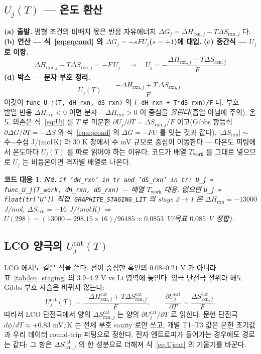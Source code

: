 \documentclass[11pt,a4paper]{article}
\newtheorem*{codebox}{코드 대응}
\newcommand{\rxn}{\mathrm{rxn}}
\newcommand{\work}{\mathrm{work}}
\newcommand{\code}[1]{\texttt{#1}}
\begin{document}
\subsection{$U_j(T)$ — 온도 환산}
\textbf{(a) 출발.} 평형 조건의 비배치 몫은 반응 자유에너지 $\Delta G_j=\Delta H_{\rxn,j}-T\Delta S_{\rxn,j}$ 다.
\textbf{(b) 연산 — 식~\eqref{eq:eqcond} 의 $\Delta G_j=-sFU_j$($s=+1$)에 대입.} \textbf{(c) 중간식 — $U_j$ 로 이항.}
\begin{equation}
\Delta H_{\rxn,j}-T\Delta S_{\rxn,j}=-F\,U_j
\quad\Longrightarrow\quad
U_j=-\frac{\Delta H_{\rxn,j}-T\Delta S_{\rxn,j}}{F}
\label{eq:Ujmid}
\end{equation}
\textbf{(d) 박스 — 분자 부호 정리.}
\begin{equation}
\boxed{\;U_j(T)\;=\;\frac{-\Delta H_{\rxn,j}+T\,\Delta S_{\rxn,j}}{F}\;.}
\label{eq:Uj}
\end{equation}
이것이 \code{func\_U\_j(T, dH\_rxn, dS\_rxn)} 의 \code{(-dH\_rxn + T*dS\_rxn)/F} 다. 부호 — 발열 반응
$\Delta H_\rxn<0$ 이면 분자 $-\Delta H_\rxn>0$ 이 중심을 \emph{올린다}(흡열 아님에 주의). 온도 의존은 식~\eqref{eq:Uj} 를
$T$ 로 미분한 $\partial U_j/\partial T=\Delta S_{\rxn,j}/F$ 이고(Gibbs 항등식 $\partial\Delta G/\partial T=-\Delta S$ 와
식~\eqref{eq:eqcond} 의 $\Delta G=-FU$ 를 잇는 것과 같다), $|\Delta S_\rxn|\sim$ 수$\sim$수십 J/(mol\,K) 라 $30$ K
창에서 수 mV 규모로 중심이 이동한다 — 다온도 피팅에서 온도마다 $U_j(T)$ 를 따로 읽어야 하는 이유다. 코드가 배열
$T_\work$ 를 그대로 넣으므로 $U_j$ 는 비등온이면 격자별 배열로 나온다.

\begin{codebox}
\textbf{N2.} \code{if 'dH\_rxn' in tr and 'dS\_rxn' in tr: U\_j = func\_U\_j(T\_work, dH\_rxn, dS\_rxn)}
— 배열 $T_\work$ 대응. 없으면 \code{U\_j = float(tr['U'])} 직접. \code{GRAPHITE\_STAGING\_LIT} 의 stage 2$\to$1 은
$\Delta H_\rxn=-13000$ J/mol, $\Delta S_\rxn=-16$ J/(mol\,K) $\Rightarrow$ $U(298)=(13000-298.15\times16)/96485
\approx0.0853$ V(목표 $0.085$ V 정합).
\end{codebox}

\subsection{LCO 양극의 $U_j^\mathrm{cat}(T)$}
LCO 에서도 같은 식을 쓴다. 전이 중심만 흑연의 $0.08$--$0.21$ V 가 아니라 표~\ref{tab:lco_staging} 의
$3.9$--$4.2$ V vs Li 영역에 놓인다. 양극 단전극 전위라 해도 Gibbs 부호 사슬은 바뀌지 않는다:
\begin{equation}
U_j^\mathrm{cat}(T)=\frac{-\Delta H_{\rxn,j}^\mathrm{cat}
+T\Delta S_{\rxn,j}^\mathrm{cat}}{F},
\qquad
\frac{\partial U_j^\mathrm{cat}}{\partial T}
=\frac{\Delta S_{\rxn,j}^\mathrm{cat}}{F}.
\label{eq:Ujcat}
\end{equation}
따라서 LCO 단전극에서 양의 $\Delta S_{\rxn,j}^\mathrm{cat}$ 는 양의
$\partial U_j^\mathrm{cat}/\partial T$ 로 읽힌다. 문헌 단전극 $d\phi/dT\approx+0.83$ mV/K 는 전체 부호 sanity 로만 쓰고,
개별 T1--T3 값은 문헌 초기값과 우리 데이터 round-trip 피팅으로 정한다. 전자 엔트로피가 들어가는 경우에도 경로는 같다:
그 항은 $\Delta S_{\rxn,j}^\mathrm{cat}$ 의 한 성분으로 더해져 식~\eqref{eq:Ujcat} 의 기울기를 바꾼다.
\end{document}
